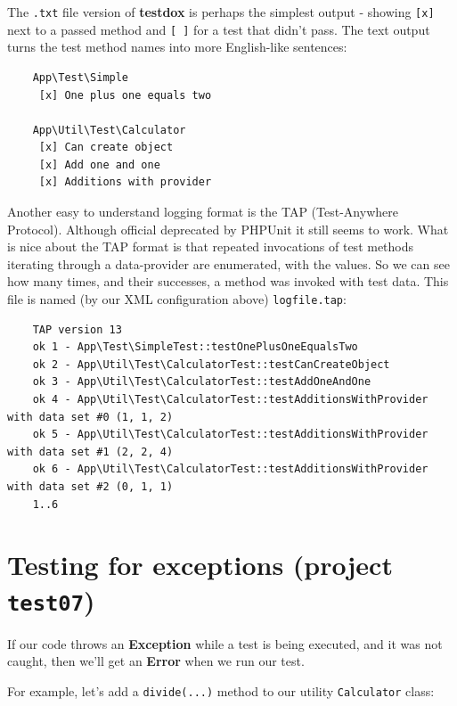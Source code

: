 \documentclass[a4paperpaper,openright]{book}
\begin{document}
The \texttt{.txt} file version of \textbf{testdox} is perhaps the
simplest output - showing \texttt{{[}x{]}} next to a passed method and
\texttt{{[}\ {]}} for a test that didn't pass. The text output turns the
test method names into more English-like sentences:

\begin{verbatim}
    App\Test\Simple
     [x] One plus one equals two

    App\Util\Test\Calculator
     [x] Can create object
     [x] Add one and one
     [x] Additions with provider
\end{verbatim}

Another easy to understand logging format is the TAP (Test-Anywhere
Protocol). Although official deprecated by PHPUnit it still seems to
work. What is nice about the TAP format is that repeated invocations of
test methods iterating through a data-provider are enumerated, with the
values. So we can see how many times, and their successes, a method was
invoked with test data. This file is named (by our XML configuration
above) \texttt{logfile.tap}:

\begin{verbatim}
    TAP version 13
    ok 1 - App\Test\SimpleTest::testOnePlusOneEqualsTwo
    ok 2 - App\Util\Test\CalculatorTest::testCanCreateObject
    ok 3 - App\Util\Test\CalculatorTest::testAddOneAndOne
    ok 4 - App\Util\Test\CalculatorTest::testAdditionsWithProvider with data set #0 (1, 1, 2)
    ok 5 - App\Util\Test\CalculatorTest::testAdditionsWithProvider with data set #1 (2, 2, 4)
    ok 6 - App\Util\Test\CalculatorTest::testAdditionsWithProvider with data set #2 (0, 1, 1)
    1..6
\end{verbatim}

\hypertarget{testing-for-exceptions-project-test07}{%
\section{\texorpdfstring{Testing for exceptions (project
\texttt{test07})}{Testing for exceptions (project test07)}}\label{testing-for-exceptions-project-test07}}

If our code throws an \textbf{Exception} while a test is being executed,
and it was not caught, then we'll get an \textbf{Error} when we run our
test.

For example, let's add a \texttt{divide(...)} method to our utility
\texttt{Calculator} class:
\end{document}
